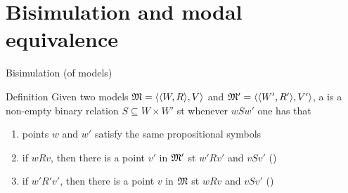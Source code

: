 \documentclass{beamer}
\begin{document}
\section{Bisimulation and modal equivalence}
\begin{slide}{Bisimulation (of models)}\label{s:29}
\small
\begin{block}{Definition}
Given two models $\mathfrak{M} = \mathopen{\langle}\mathopen{\langle}W, R\mathclose{\rangle}, V\mathclose{\rangle}$ and $\mathfrak{M}' = \mathopen{\langle}\mathopen{\langle}W', R'\mathclose{\rangle}, V'\mathclose{\rangle}$, a  is a non-empty binary relation
$S \subseteq W \times W'$  st whenever $w S w'$ one has that
\begin{enumerate}
\item points $w$ and $w'$ satisfy the same propositional symbols
\item if $w R v$, then there is a point $v'$ in $\mathfrak{M}'$ st  $w' R v'$ and $v S v'$ \hspace{0.3cm} ()
\item if $w' R' v'$, then there is a point $v$ in $\mathfrak{M}$ st  $w R v$ and $v S v'$ \hspace{0.3cm} ()
\end{enumerate}
\end{block}
\end{slide}

\end{document}
